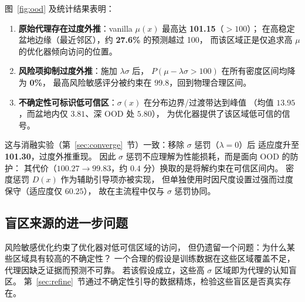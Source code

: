 图~\ref{fig:ood} 及统计结果表明：
\begin{enumerate}
    \item \textbf{原始代理存在过度外推}：vanilla $\mu(x)$ 最高达 \textbf{101.15}（$>100$）；
        在高稳定盆地边缘（最近邻区），约 \textbf{27.6\%} 的预测越过 100，
        而该区域正是仅追求高 $\mu$ 的优化器倾向访问的位置。
    \item \textbf{风险项抑制过度外推}：施加 $\lambda\sigma$ 后，
        $P(\mu-\lambda\sigma>100)$ 在所有密度区间均降为 \textbf{0\%}，
        最高风险敏感评分被约束在 $99.8$，回到物理合理区间。
    \item \textbf{不确定性可标识低可信区}：$\sigma(x)$ 在分布边界/过渡带达到峰值
        （均值 $13.95$，而盆地内仅 $3.81$、深 OOD 处 $5.80$），
        为优化器提供了该区域低可信的信号。
\end{enumerate}

这与消融实验（第~\ref{sec:converge}~节）一致：移除 $\sigma$ 惩罚（$\lambda=0$）后
适应度升至 \textbf{101.30}，过度外推重现。
因此 $\sigma$ 惩罚不应理解为性能损耗，而是面向 OOD 的防护：
其代价（$100.27\to99.83$，约 $0.4$ 分）换取的是将解约束在可信区间内。
密度惩罚 $D(x)$ 作为辅助引导项亦被实现，
但单独使用时因尺度设置过强而过度保守（适应度仅 $60.25$），
故在主流程中仅与 $\sigma$ 惩罚协同。

\subsection{盲区来源的进一步问题}

风险敏感优化约束了优化器对低可信区域的访问，
但仍遗留一个问题：为什么某些区域具有较高的不确定性？
一个合理的假设是训练数据在这些区域覆盖不足，代理因缺乏证据而预测不可靠。
若该假设成立，这些高 $\sigma$ 区域即为代理的认知盲区。
第~\ref{sec:refine}~节通过不确定性引导的数据精炼，检验这些盲区是否真实存在。
